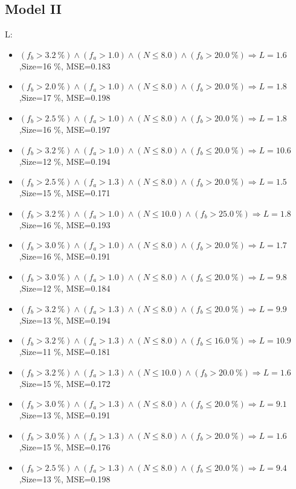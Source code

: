 \documentclass[numbered]{CSL}
\begin{document}
\subsection{Model II}
L:
\begin{itemize}
\item $(f_b > 3.2~\%) \land (f_a > 1.0) \land (N \leq 8.0) \land (f_b > 20.0~\%) \Rightarrow L = 1.6$,\hfill Size=16 \%, MSE=0.183
\item $(f_b > 2.0~\%) \land (f_a > 1.0) \land (N \leq 8.0) \land (f_b > 20.0~\%) \Rightarrow L = 1.8$,\hfill Size=17 \%, MSE=0.198
\item $(f_b > 2.5~\%) \land (f_a > 1.0) \land (N \leq 8.0) \land (f_b > 20.0~\%) \Rightarrow L = 1.8$,\hfill Size=16 \%, MSE=0.197
\item $(f_b > 3.2~\%) \land (f_a > 1.0) \land (N \leq 8.0) \land (f_b \leq 20.0~\%) \Rightarrow L = 10.6$,\hfill Size=12 \%, MSE=0.194
\item $(f_b > 2.5~\%) \land (f_a > 1.3) \land (N \leq 8.0) \land (f_b > 20.0~\%) \Rightarrow L = 1.5$,\hfill Size=15 \%, MSE=0.171
\item $(f_b > 3.2~\%) \land (f_a > 1.0) \land (N \leq 10.0) \land (f_b > 25.0~\%) \Rightarrow L = 1.8$,\hfill Size=16 \%, MSE=0.193
\item $(f_b > 3.0~\%) \land (f_a > 1.0) \land (N \leq 8.0) \land (f_b > 20.0~\%) \Rightarrow L = 1.7$,\hfill Size=16 \%, MSE=0.191
\item $(f_b > 3.0~\%) \land (f_a > 1.0) \land (N \leq 8.0) \land (f_b \leq 20.0~\%) \Rightarrow L = 9.8$,\hfill Size=12 \%, MSE=0.184
\item $(f_b > 3.2~\%) \land (f_a > 1.3) \land (N \leq 8.0) \land (f_b \leq 20.0~\%) \Rightarrow L = 9.9$,\hfill Size=13 \%, MSE=0.194
\item $(f_b > 3.2~\%) \land (f_a > 1.3) \land (N \leq 8.0) \land (f_b \leq 16.0~\%) \Rightarrow L = 10.9$,\hfill Size=11 \%, MSE=0.181
\item $(f_b > 3.2~\%) \land (f_a > 1.3) \land (N \leq 10.0) \land (f_b > 20.0~\%) \Rightarrow L = 1.6$,\hfill Size=15 \%, MSE=0.172
\item $(f_b > 3.0~\%) \land (f_a > 1.3) \land (N \leq 8.0) \land (f_b \leq 20.0~\%) \Rightarrow L = 9.1$,\hfill Size=13 \%, MSE=0.191
\item $(f_b > 3.0~\%) \land (f_a > 1.3) \land (N \leq 8.0) \land (f_b > 20.0~\%) \Rightarrow L = 1.6$,\hfill Size=15 \%, MSE=0.176
\item $(f_b > 2.5~\%) \land (f_a > 1.3) \land (N \leq 8.0) \land (f_b \leq 20.0~\%) \Rightarrow L = 9.4$,\hfill Size=13 \%, MSE=0.198

\end{itemize}
\end{document}
